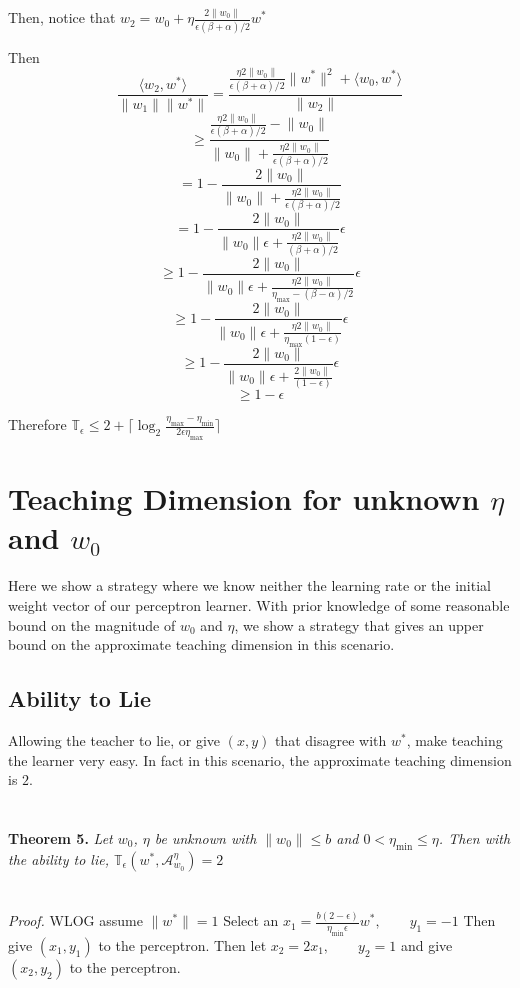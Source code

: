 \documentclass{article}
\newcommand{\learn}{\mathcal{A}_{w_0}^\eta}
\begin{document}
Then,
notice that $w_2 = w_0 +\eta \frac{2  \lVert w_0 \rVert}{\epsilon (\beta + \alpha)/2} w^*$

Then 
$$
\frac{\langle w_2, w^* \rangle}{\lVert w_1 \rVert \lVert w^* \rVert} = \frac{
\frac{\eta 2  \lVert w_0 \rVert}{\epsilon (\beta + \alpha)/2} \lVert w^* \lVert ^2 + \langle w_0, w^* \rangle}{\lVert w_2 \rVert}
$$ 
$$
\geq \frac{\frac{\eta 2  \lVert w_0 \rVert}{\epsilon (\beta + \alpha)/2} - \lVert w_0 \rVert}{\lVert w_0 \rVert +\frac{\eta 2  \lVert w_0 \rVert}{\epsilon (\beta + \alpha)/2} }
$$
$$
= 1 - \frac{2 \lVert w_0  \rVert}{\lVert w_0 \rVert +\frac{\eta 2  \lVert w_0 \rVert}{\epsilon (\beta + \alpha)/2} }
$$
$$
= 1 - \frac{2\lVert w_0 \rVert}{\lVert w_0  \rVert \epsilon + \frac{\eta 2  \lVert w_0 \rVert}{(\beta + \alpha)/2} } \epsilon
$$
$$
\geq  1 - \frac{2\lVert w_0 \rVert}{\lVert w_0  \rVert \epsilon + \frac{\eta 2  \lVert w_0 \rVert}{\eta_{\max} - (\beta - \alpha) / 2} } \epsilon
$$
$$
\geq  1 - \frac{2\lVert w_0 \rVert}{\lVert w_0  \rVert \epsilon + \frac{\eta 2  \lVert w_0 \rVert}{\eta_{\max} (1-\epsilon)} } \epsilon
$$
$$
\geq 1 - \frac{2\lVert w_0 \rVert}{\lVert w_0  \rVert \epsilon + \frac{ 2  \lVert w_0 \rVert}{(1-\epsilon)} } \epsilon
$$
$$
\geq 1 - \epsilon
$$

Therefore 
$\mathbb{T}_\epsilon \leq  2 + \lceil \log_2 \frac{\eta_{\max} - \eta_{\min}}{2\epsilon\eta_{\max}}  \rceil$

\section{Teaching Dimension for unknown $\eta$ and $w_0$}
Here we show a strategy where we know neither the learning rate or the initial weight vector of our perceptron learner. With prior knowledge of some reasonable bound on the magnitude of $w_0$ and $\eta$, we show a strategy that gives an upper bound on the approximate teaching dimension in this scenario.


\subsection{Ability to Lie}
Allowing the teacher to lie, or give $(x,y)$ that disagree with $w^*$, make teaching the learner very easy. In fact in this scenario, the approximate teaching dimension is $2$.
\\
\\
\\
\textbf{Theorem 5.} \textit{
Let $w_0$, $\eta$ be unknown with $\lVert w_0 \rVert \leq b$ and $0 < \eta_{\min} \leq \eta$.
Then with the ability to lie, $\mathbb{T}_{\epsilon}(w^*, \learn) = 2$
}
\\
\\
\\
\textit{Proof.}
WLOG assume $\lVert w^* \rVert = 1$
Select an $x_1 = \frac{b(2-\epsilon)}{\eta_{\min} \epsilon}w^*, \qquad y_1 = -1$
Then give $(x_1 , y _1)$ to the perceptron.
Then let $x_2 = 2x_1, \qquad y_2 = 1$ and give $(x_2, y_2)$ to the perceptron.
\end{document}
